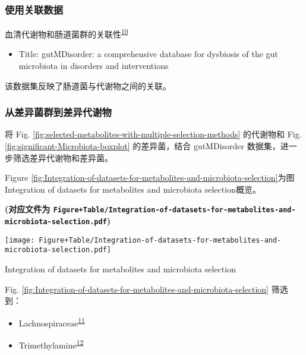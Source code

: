 \documentclass[
]{article}
\providecommand{\tightlist}{%
  \setlength{\itemsep}{0pt}\setlength{\parskip}{0pt}}
\begin{document}
\hypertarget{ux4f7fux7528ux5173ux8054ux6570ux636e}{%
\subsubsection{使用关联数据}\label{ux4f7fux7528ux5173ux8054ux6570ux636e}}

血清代谢物和肠道菌群的关联性\textsuperscript{\protect\hyperlink{ref-GutmdisorderACheng2019}{10}}

\begin{itemize}
\tightlist
\item
  Title: gutMDisorder: a comprehensive database for dysbiosis of the gut microbiota in disorders and interventions
\end{itemize}

该数据集反映了肠道菌与代谢物之间的关联。

\hypertarget{ux4eceux5deeux5f02ux83ccux7fa4ux5230ux5deeux5f02ux4ee3ux8c22ux7269}{%
\subsubsection{从差异菌群到差异代谢物}\label{ux4eceux5deeux5f02ux83ccux7fa4ux5230ux5deeux5f02ux4ee3ux8c22ux7269}}

将 Fig. \ref{fig:selected-metabolites-with-multiple-selection-methods} 的代谢物和
Fig. \ref{fig:significant-Microbiota-boxplot} 的差异菌，结合 gutMDisorder 数据集，进一步筛选差异代谢物和差异菌。

Figure \ref{fig:Integration-of-datasets-for-metabolites-and-microbiota-selection}为图Integration of datasets for metabolites and microbiota selection概览。

\textbf{(对应文件为 \texttt{Figure+Table/Integration-of-datasets-for-metabolites-and-microbiota-selection.pdf})}

\def\@captype{figure}
\begin{center}
\texttt{[image: Figure+Table/Integration-of-datasets-for-metabolites-and-microbiota-selection.pdf]}
\caption{Integration of datasets for metabolites and microbiota selection}\label{fig:Integration-of-datasets-for-metabolites-and-microbiota-selection}
\end{center}

Fig. \ref{fig:Integration-of-datasets-for-metabolites-and-microbiota-selection} 筛选到：

\begin{itemize}
\tightlist
\item
  Lachnospiraceae\textsuperscript{\protect\hyperlink{ref-TheControversiVacca2020}{11}}
\item
  Trimethylamine\textsuperscript{\protect\hyperlink{ref-TheRoleOfAGPravee2022}{12}}
\end{itemize}
\end{document}
